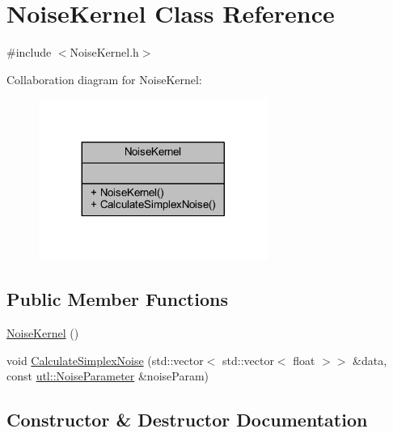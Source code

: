 \hypertarget{class_noise_kernel}{}\section{Noise\+Kernel Class Reference}
\label{class_noise_kernel}


{\ttfamily \#include $<$Noise\+Kernel.\+h$>$}



Collaboration diagram for Noise\+Kernel\+:
\nopagebreak
\begin{figure}[H]
\begin{center}
\leavevmode
\includegraphics[width=212pt]{class_noise_kernel__coll__graph}
\end{center}
\end{figure}
\subsection*{Public Member Functions}
\begin{DoxyCompactItemize}
\item 
\mbox{\hyperlink{class_noise_kernel_a0a2ef52c6a860222976a2f7f8a56d4a2}{Noise\+Kernel}} ()
\item 
void \mbox{\hyperlink{class_noise_kernel_a644b4289ce93b14b98734b904c4df62a}{Calculate\+Simplex\+Noise}} (std\+::vector$<$ std\+::vector$<$ float $>$$>$ \&data, const \mbox{\hyperlink{structutl_1_1_noise_parameter}{utl\+::\+Noise\+Parameter}} \&noise\+Param)
\end{DoxyCompactItemize}


\subsection{Constructor \& Destructor Documentation}
\mbox{\label{class_noise_kernel_a0a2ef52c6a860222976a2f7f8a56d4a2}} 
